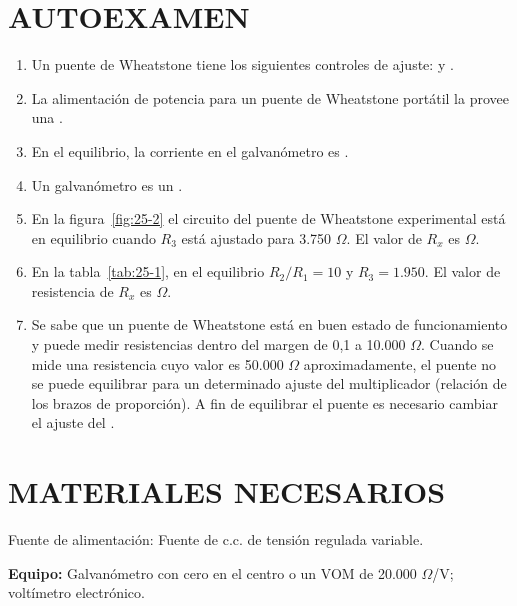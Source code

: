 \documentclass{article}
\numberwithin{equation}{subsection}
\numberwithin{figure}{section}
\numberwithin{table}{section}
\begin{document}
\newpage
\section{AUTOEXAMEN}
\begin{enumerate}
    \item Un puente de Wheatstone tiene los siguientes controles de ajuste: \underline{\hspace{2cm}} y 
    \underline{\hspace{2cm}}.
    \item La alimentación de potencia para un puente de Wheatstone portátil la provee una \underline{\hspace{2cm}}.
    \item En el equilibrio, la corriente en el galvanómetro es \underline{\hspace{2cm}}.
    \item Un galvanómetro es un \underline{\hspace{2cm}}.
    \item En la figura~\ref{fig:25-2} el circuito del puente de Wheatstone experimental está en equilibrio cuando $R_3$ 
    está ajustado para 3.750 $\Omega$. El valor de $R_x$ es \underline{\hspace{2cm}} $\Omega$.
    \item En la tabla~\ref{tab:25-1}, en el equilibrio $R_2/R_1 = 10$ y $R_3 = 1.950$. El valor de resistencia de $R_x$ 
    es \underline{\hspace{2cm}} $\Omega$.
    \item Se sabe que un puente de Wheatstone está en buen estado de funcionamiento y puede medir resistencias dentro 
    del margen de 0,1 a 10.000 $\Omega$. Cuando se mide una resistencia cuyo valor es 50.000 $\Omega$ aproximadamente, 
    el puente no se puede equilibrar para un determinado ajuste del multiplicador (relación de los brazos de proporción). 
    A fin de equilibrar el puente es necesario cambiar el ajuste del \underline{\hspace{2cm}}.
\end{enumerate}

\section{MATERIALES NECESARIOS}
Fuente de alimentación: Fuente de c.c. de tensión regulada variable.

\textbf{Equipo:} Galvanómetro con cero en el centro o un VOM de 20.000 $\Omega$/V; voltímetro electrónico.
\end{document}
